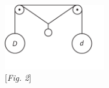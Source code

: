\pend
\vspace*{2.5em}
\pstart
\begin{center}
\noindent \includegraphics[trim = 0mm 10mm 0mm 0mm, clip, width=0.33\textwidth]{images/lh0351402127r-2.pdf}\\
\noindent \hspace{-8mm}[\textit{Fig. 2}] 
\end{center}
\pend
\count{}
\count{}
 


 


